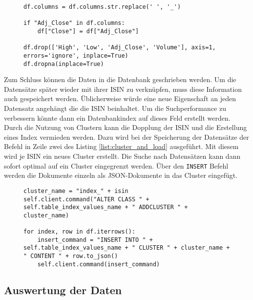 \begin{figure}[!htb]
    \begin{lstlisting}[caption=Transformation eines DataFrames, label=list:transformation]
df.columns = df.columns.str.replace(' ', '_')

if "Adj_Close" in df.columns:
    df["Close"] = df["Adj_Close"]

df.drop(['High', 'Low', 'Adj_Close', 'Volume'], axis=1, errors='ignore', inplace=True)
df.dropna(inplace=True)
    \end{lstlisting}
\end{figure}

Zum Schluss können die Daten in die Datenbank geschrieben werden. Um die Datensätze später wieder mit ihrer \gls{ISIN} zu verknüpfen, muss diese Information auch gespeichert werden. Üblicherweise würde eine neue Eigenschaft an jeden Datensatz angehängt die die \gls{ISIN} beinhaltet. Um die Suchperformance zu verbessern könnte dann ein Datenbankindex auf dieses Feld erstellt werden. Durch die Nutzung von Clustern kann die Dopplung der \gls{ISIN} und die Erstellung eines Index vermieden werden. Dazu wird bei der Speicherung der Datensätze der Befehl in Zeile zwei des Listing \ref{list:cluster_and_load} ausgeführt. Mit diesem wird je \gls{ISIN} ein neues Cluster erstellt. Die Suche nach Datensätzen kann dann sofort optimal auf ein Cluster eingegrenzt werden. Über den \texttt{INSERT} Befehl werden die Dokumente einzeln als \gls{JSON}-Dokumente in das Cluster eingefügt.

\begin{figure}[!htb]
    \begin{lstlisting}[caption=Erstellung eines Clusters und Einfügen der Datensätze, label=list:cluster_and_load]
cluster_name = "index_" + isin
self.client.command("ALTER CLASS " + self.table_index_values_name + " ADDCLUSTER " + cluster_name)

for index, row in df.iterrows():
    insert_command = "INSERT INTO " + self.table_index_values_name + " CLUSTER " + cluster_name + " CONTENT " + row.to_json()
    self.client.command(insert_command)
    \end{lstlisting}
\end{figure}


\subsection{Auswertung der Daten}

\clearpage